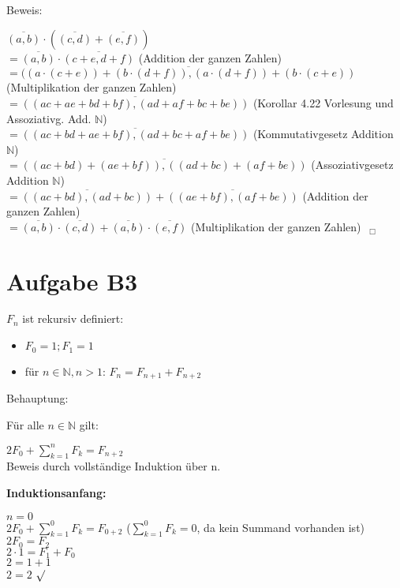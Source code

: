 \documentclass[11pt,a4paper]{article}
\begin{document}
Beweis:

$ \overline{(a,b)} \cdot ( \overline{(c,d)} + \overline{(e,f)} )$\\
$ = \overline{(a,b)} \cdot \overline{(c+e,d+f)}$   (Addition der ganzen Zahlen)\\
$ = \overline{((a \cdot (c+e)) + (b \cdot (d+f)), (a \cdot (d+f))+ (b \cdot (c+e))}$   (Multiplikation der ganzen Zahlen) \\
$ = \overline{((ac+ae+bd+bf),(ad+af+bc+be))}$   (Korollar 4.22 Vorlesung und Assoziativg. Add. $\mathbb{N}$)\\
$ = \overline{((ac+bd+ae+bf),(ad+bc+af+be))}$   (Kommutativgesetz Addition $\mathbb{N}$)\\
$ = \overline{((ac+bd)+(ae+bf)),((ad+bc)+(af+be))}$   (Assoziativgesetz Addition $\mathbb{N}$)\\
$ = \overline{((ac+bd),(ad+bc))} + \overline{((ae+bf),(af+be))}$   (Addition der ganzen Zahlen)\\
$ = \overline{(a,b)} \cdot \overline{(c,d)} + \overline{(a,b)} \cdot \overline{(e,f)}$ (Multiplikation der ganzen Zahlen) $ ~~_\Box$\\

\section*{Aufgabe B3}

$F_n$ ist rekursiv definiert:
\begin{itemize}
\item $F_0 = 1 ; F_1 = 1$
\item für $n \in \mathbb{N}, n > 1$: $F_n = F_{n+1} + F_{n+2}$
\end{itemize}
Behauptung:

Für alle $ n \in \mathbb{N}$ gilt:

$ 2F_0 + \sum \limits_{k=1}^n F_k = F_{n+2}$ \\

Beweis durch vollständige Induktion über n.

\textbf{Induktionsanfang:}

$ n = 0$ \\
$ 2F_0 + \sum \limits_{k=1}^0 F_k = F_{0+2}$ ($ \sum \limits_{k=1}^0 F_k = 0$, da kein Summand vorhanden ist) \\
$2F_0 = F_2$ \\
$2\cdot1 = F_1 + F_0$\\
$2 = 1 + 1$ \\
$2 = 2$ $\surd$ \\
\end{document}
